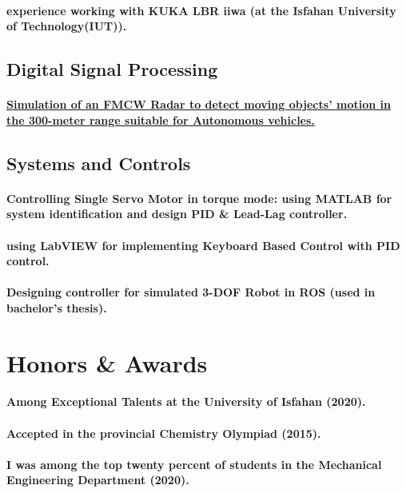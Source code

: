 \documentclass[a4paper]{article}
\begin{document}
            \paragraph{experience working with KUKA LBR iiwa (at the Isfahan University of Technology(IUT)).}
        \subsection{Digital Signal Processing}
            \paragraph{\href{https://github.com/ake1999/FMCW_Radar_Ake}{Simulation of an FMCW Radar to detect moving objects' motion in the 300-meter range suitable for Autonomous vehicles.}}
        \subsection{Systems and Controls}
            \paragraph{Controlling Single Servo Motor in torque mode: using MATLAB for system identification and design PID \& Lead-Lag controller.}
            \paragraph{using LabVIEW for implementing Keyboard Based Control with PID control.}
            \paragraph{Designing controller for simulated 3-DOF Robot in ROS (used in bachelor's thesis).}\pagebreak
    \section{Honors \& Awards}
        \paragraph{Among Exceptional Talents at the University of Isfahan (2020).}
        \paragraph{Accepted in the provincial Chemistry Olympiad (2015).}
        \paragraph{I was among the top twenty percent of students in the Mechanical Engineering Department (2020).}
\end{document}

